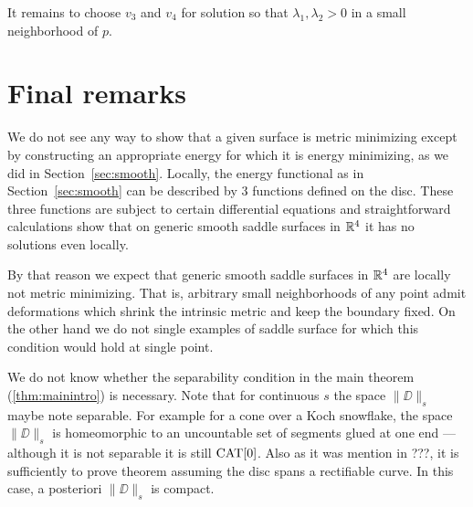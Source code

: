 \documentclass{article}
\begin{document}
It remains to choose $v_3$ and $v_4$ for solution so that $\lambda_1, \lambda_2>0$ in a small neighborhood of $p$.
\qeds


\section{Final remarks}\label{Final remarks}

We do not see any way to show that a given surface is metric minimizing except by constructing an appropriate energy for which it is energy minimizing, as we did in Section~\ref{sec:smooth}.
Locally, the energy functional as in Section~\ref{sec:smooth} can be described by 3 functions defined on the disc.
These three functions are subject to certain differential equations and 
straightforward calculations show that on generic smooth saddle surfaces in $\mathbb{R}^4$ 
it has no solutions even locally.

By that reason we expect that generic smooth saddle surfaces in $\mathbb{R}^4$ are locally not metric minimizing. 
That is, arbitrary small neighborhoods of any point admit deformations which shrink 
the intrinsic metric and keep the boundary fixed.
On the other hand we do not single examples of saddle surface for which this condition would hold at single point.

We do not know whether the separability condition in the main theorem (\ref{thm:mainintro}) is necessary.
Note that for continuous $s$ the space $\|\DD\|_s$ maybe note separable.
For example for a cone over a Koch snowflake, the space $\|\DD\|_s$ is homeomorphic to an uncountable set of segments glued at one end --- although it is not separable it is still $\mathop{\rm CAT}\nolimits[0]$.
Also as it was mention in ???, 
it is sufficiently to prove theorem assuming the disc spans a rectifiable curve.
In this case, a posteriori $\|\DD\|_s$ is compact.


\end{document}
